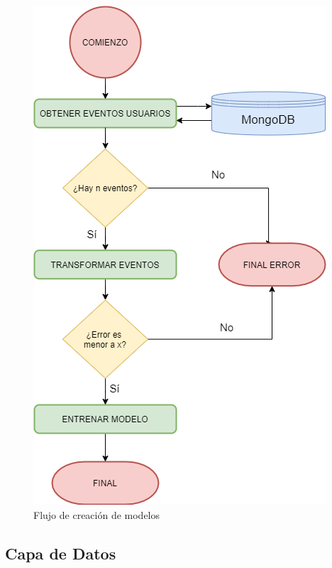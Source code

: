 \begin{figure}[htbp!]
\begin{minipage}{.49\textwidth}
        \includegraphics[width=\linewidth,keepaspectratio]{images/orquestation/workflow_model.png}
        \caption{Flujo de creación de modelos}
        \label{fig:workflow_model}
    \end{minipage}

\end{figure}

\subsection{Capa de Datos}

